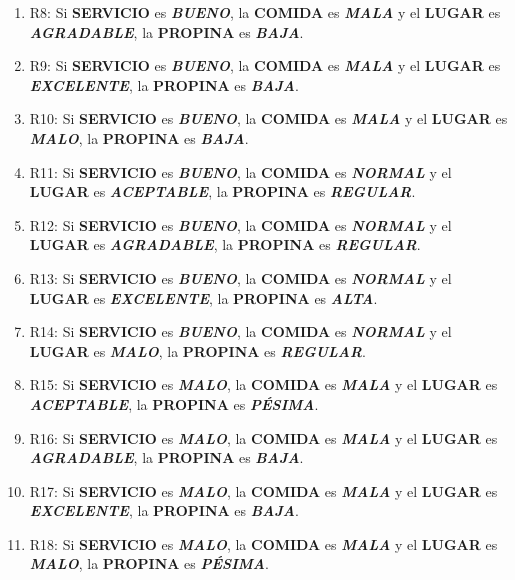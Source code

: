 \documentclass[11pt, letterpaper]{article}
\begin{document}
\begin{enumerate}
	\item R8: Si \textbf{SERVICIO} es \textbf{\textit{BUENO}}, la \textbf{COMIDA} es \textbf{\textit{MALA}} y el \textbf{LUGAR} es \textbf{\textit{AGRADABLE}}, la \textbf{PROPINA} es \textbf{\textit{BAJA}}.
	\item R9: Si \textbf{SERVICIO} es \textbf{\textit{BUENO}}, la \textbf{COMIDA} es \textbf{\textit{MALA}} y el \textbf{LUGAR} es \textbf{\textit{EXCELENTE}}, la \textbf{PROPINA} es \textbf{\textit{BAJA}}.
	\item R10: Si \textbf{SERVICIO} es \textbf{\textit{BUENO}}, la \textbf{COMIDA} es \textbf{\textit{MALA}} y el \textbf{LUGAR} es \textbf{\textit{MALO}}, la \textbf{PROPINA} es \textbf{\textit{BAJA}}.
	\item R11: Si \textbf{SERVICIO} es \textbf{\textit{BUENO}}, la \textbf{COMIDA} es \textbf{\textit{NORMAL}} y el \textbf{LUGAR} es \textbf{\textit{ACEPTABLE}}, la \textbf{PROPINA} es \textbf{\textit{REGULAR}}.
	\item R12: Si \textbf{SERVICIO} es \textbf{\textit{BUENO}}, la \textbf{COMIDA} es \textbf{\textit{NORMAL}} y el \textbf{LUGAR} es \textbf{\textit{AGRADABLE}}, la \textbf{PROPINA} es \textbf{\textit{REGULAR}}.
	\item R13: Si \textbf{SERVICIO} es \textbf{\textit{BUENO}}, la \textbf{COMIDA} es \textbf{\textit{NORMAL}} y el \textbf{LUGAR} es \textbf{\textit{EXCELENTE}}, la \textbf{PROPINA} es \textbf{\textit{ALTA}}.
	\item R14: Si \textbf{SERVICIO} es \textbf{\textit{BUENO}}, la \textbf{COMIDA} es \textbf{\textit{NORMAL}} y el \textbf{LUGAR} es \textbf{\textit{MALO}}, la \textbf{PROPINA} es \textbf{\textit{REGULAR}}.
	\item R15: Si \textbf{SERVICIO} es \textbf{\textit{MALO}}, la \textbf{COMIDA} es \textbf{\textit{MALA}} y el \textbf{LUGAR} es \textbf{\textit{ACEPTABLE}}, la \textbf{PROPINA} es \textbf{\textit{PÉSIMA}}.
	\item R16: Si \textbf{SERVICIO} es \textbf{\textit{MALO}}, la \textbf{COMIDA} es \textbf{\textit{MALA}} y el \textbf{LUGAR} es \textbf{\textit{AGRADABLE}}, la \textbf{PROPINA} es \textbf{\textit{BAJA}}.
	\item R17: Si \textbf{SERVICIO} es \textbf{\textit{MALO}}, la \textbf{COMIDA} es \textbf{\textit{MALA}} y el \textbf{LUGAR} es \textbf{\textit{EXCELENTE}}, la \textbf{PROPINA} es \textbf{\textit{BAJA}}.
	\item R18: Si \textbf{SERVICIO} es \textbf{\textit{MALO}}, la \textbf{COMIDA} es \textbf{\textit{MALA}} y el \textbf{LUGAR} es \textbf{\textit{MALO}}, la \textbf{PROPINA} es \textbf{\textit{PÉSIMA}}.

\end{enumerate}
\end{document}

